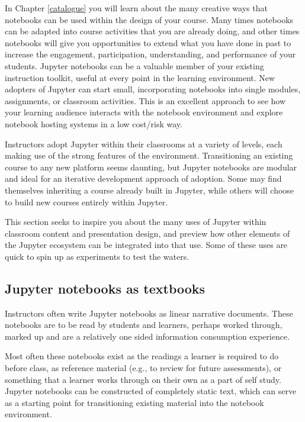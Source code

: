 \documentclass[]{book}
\begin{document}
In Chapter \ref{catalogue} you will learn about the many creative ways
that notebooks can be used within the design of your course. Many times
notebooks can be adapted into course activities that you are already
doing, and other times notebooks will give you opportunities to extend
what you have done in past to increase the engagement, participation,
understanding, and performance of your students. Jupyter notebooks can
be a valuable member of your existing instruction toolkit, useful at
every point in the learning environment. New adopters of Jupyter can
start small, incorporating notebooks into single modules, assignments,
or classroom activities. This is an excellent approach to see how your
learning audience interacts with the notebook environment and explore
notebook hosting systems in a low cost/risk way.

Instructors adopt Jupyter within their classrooms at a variety of
levels, each making use of the strong features of the environment.
Transitioning an existing course to any new platform seems daunting, but
Jupyter notebooks are modular and ideal for an iterative development
approach of adoption. Some may find themselves inheriting a course
already built in Jupyter, while others will choose to build new courses
entirely within Jupyter.

This section seeks to inspire you about the many uses of Jupyter within
classroom content and presentation design, and preview how other
elements of the Jupyter ecosystem can be integrated into that use. Some
of these uses are quick to spin up as experiments to test the waters.

\subsection{Jupyter notebooks as
textbooks}\label{jupyter-notebooks-as-textbooks}

Instructors often write Jupyter notebooks as linear narrative documents.
These notebooks are to be read by students and learners, perhaps worked
through, marked up and are a relatively one sided information
consumption experience.

Most often these notebooks exist as the readings a learner is required
to do before class, as reference material (e.g., to review for future
assessments), or something that a learner works through on their own as
a part of self study. Jupyter notebooks can be constructed of completely
static text, which can serve as a starting point for transitioning
existing material into the notebook environment.
\end{document}
